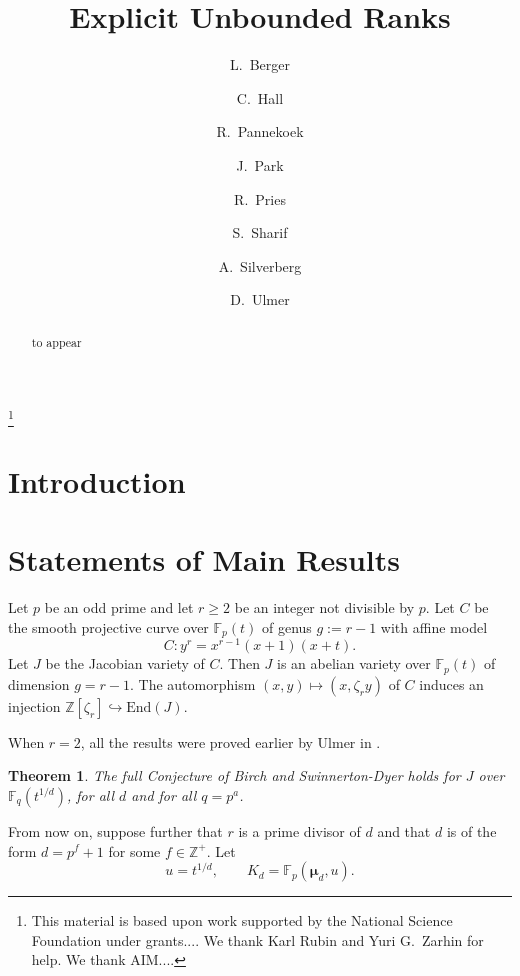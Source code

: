 \documentclass[reqno]{amsart}
\newtheorem{thm}{Theorem}[section]
\theoremstyle{definition}
\theoremstyle{remark}
\def\bmu{{\boldsymbol\mu}}
\def\Z{\mathbb{Z}}
\def\F{\mathbb{F}}
\def \End{\mathrm{End}}
\begin{document}
\title[Explicit Unbounded Ranks]{Explicit Unbounded Ranks}
\author[Explicit Unbounded Ranks]{L.\ Berger}
\address{}
\email{}
\author[]{C.\ Hall}
\address{}
\email{}
\author[]{R.\ Pannekoek}
\address{}
\email{}
\author[]{J.\ Park}
\address{}
\email{}
\author[]{R.\ Pries}
\address{}
\email{}
\author[]{S.\ Sharif}
\address{}
\email{}
\author[]{A.\ Silverberg}
\address{Department of Mathematics, UC Irvine, Irvine, CA 92697, USA}
\author[]{D.\ Ulmer}
\address{School of Mathematics, Georgia Institute of Technology, Atlanta, GA 30332, USA}
\thanks{This material is based upon work supported by the 
National Science Foundation under grants....  We thank Karl Rubin and Yuri G.\ Zarhin for
help. We thank AIM....}


\begin{abstract}  
to appear
\end{abstract}


\maketitle

\section{Introduction}

\section{Statements of Main Results}

Let $p$ be an odd prime and let $r \ge 2$ be an integer not divisible by $p$.
Let $C$ be the smooth projective curve over $\F_p(t)$ of genus $g:=r-1$ with affine model
\[ C : y^r=x^{r-1}(x+1)(x+t).\]
Let $J$ be the Jacobian variety of $C$. Then $J$ is an abelian variety
over $\F_p(t)$ of dimension $g=r-1$. The automorphism
$(x,y) \mapsto (x,\zeta_r y)$ of $C$ induces an injection
$\Z[\zeta_r] \hookrightarrow\End(J)$.

When $r=2$, all the results were proved earlier by Ulmer in \cite{Legendre}.

\begin{thm}
\label{fullBSDthm}
The full Conjecture of Birch and Swinnerton-Dyer holds for
$J$ over $\F_q(t^{1/d})$, for all $d$ and for all $q=p^a$. 
\end{thm}


From now on, suppose further that $r$ is a prime divisor of $d$ 
and that $d$ is of the form $d=p^f+1$ for some $f\in\Z^+$.
Let
$$u=t^{1/d}, \qquad
K_d=\F_p(\bmu_d,u).$$
\end{document}
